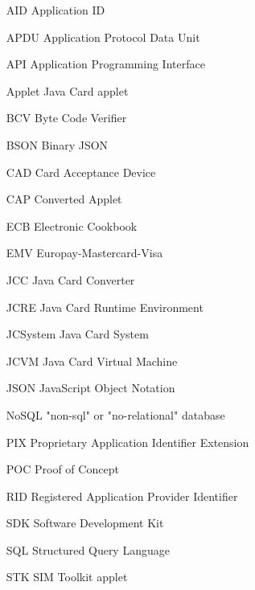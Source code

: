 \begin{enumerate}[align=left]
    \item[AID] Application ID
    \item[APDU] Application Protocol Data Unit
    \item[API] Application Programming Interface
    \item[Applet] Java Card applet
    \item[BCV] Byte Code Verifier
    \item[BSON] Binary JSON
    \item[CAD] Card Acceptance Device
    \item[CAP] Converted Applet
    \item[ECB] Electronic Cookbook
    \item[EMV] Europay-Mastercard-Visa
    \item[JCC] Java Card Converter
    \item[JCRE] Java Card Runtime Environment
    \item[JCSystem] Java Card System
    \item[JCVM] Java Card Virtual Machine
    \item[JSON] JavaScript Object Notation
    \item[NoSQL] "non-sql" or "no-relational" database
    \item[PIX] Proprietary Application Identifier Extension
    \item[POC] Proof of Concept
    \item[RID] Registered Application Provider Identifier
    \item[SDK] Software Development Kit
    \item[SQL] Structured Query Language
    \item[STK] SIM Toolkit applet
\end{enumerate}
